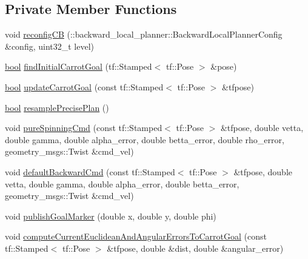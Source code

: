 \subsection*{Private Member Functions}
\begin{DoxyCompactItemize}
\item 
void \hyperlink{classcl__move__base__z_1_1backward__local__planner_1_1BackwardLocalPlanner_a62e4783adae03ce92190d855a021b91d}{reconfig\+CB} (\+::backward\+\_\+local\+\_\+planner\+::\+Backward\+Local\+Planner\+Config \&config, uint32\+\_\+t level)
\item 
\hyperlink{classbool}{bool} \hyperlink{classcl__move__base__z_1_1backward__local__planner_1_1BackwardLocalPlanner_a0025cd3ffaa04a6a02492a33673a78a1}{find\+Initial\+Carrot\+Goal} (tf\+::\+Stamped$<$ tf\+::\+Pose $>$ \&pose)
\item 
\hyperlink{classbool}{bool} \hyperlink{classcl__move__base__z_1_1backward__local__planner_1_1BackwardLocalPlanner_a16e79a1b4c0f18879f6f0a8ba67103fd}{update\+Carrot\+Goal} (const tf\+::\+Stamped$<$ tf\+::\+Pose $>$ \&tfpose)
\item 
\hyperlink{classbool}{bool} \hyperlink{classcl__move__base__z_1_1backward__local__planner_1_1BackwardLocalPlanner_a100fe8bdaaf89b0fa54ecf2aef0966ed}{resample\+Precise\+Plan} ()
\item 
void \hyperlink{classcl__move__base__z_1_1backward__local__planner_1_1BackwardLocalPlanner_aaa88a0a47e7cfd449c59518577599928}{pure\+Spinning\+Cmd} (const tf\+::\+Stamped$<$ tf\+::\+Pose $>$ \&tfpose, double vetta, double gamma, double alpha\+\_\+error, double betta\+\_\+error, double rho\+\_\+error, geometry\+\_\+msgs\+::\+Twist \&cmd\+\_\+vel)
\item 
void \hyperlink{classcl__move__base__z_1_1backward__local__planner_1_1BackwardLocalPlanner_a1ebd69a028a22e3573e98f89d593f97d}{default\+Backward\+Cmd} (const tf\+::\+Stamped$<$ tf\+::\+Pose $>$ \&tfpose, double vetta, double gamma, double alpha\+\_\+error, double betta\+\_\+error, geometry\+\_\+msgs\+::\+Twist \&cmd\+\_\+vel)
\item 
void \hyperlink{classcl__move__base__z_1_1backward__local__planner_1_1BackwardLocalPlanner_a70eaeb6cf31fd3378d9fbf9bcb975995}{publish\+Goal\+Marker} (double x, double y, double phi)
\item 
void \hyperlink{classcl__move__base__z_1_1backward__local__planner_1_1BackwardLocalPlanner_ad39ba029c760fc63ea286c74b5b9b795}{compute\+Current\+Euclidean\+And\+Angular\+Errors\+To\+Carrot\+Goal} (const tf\+::\+Stamped$<$ tf\+::\+Pose $>$ \&tfpose, double \&dist, double \&angular\+\_\+error)

\end{DoxyCompactItemize}
